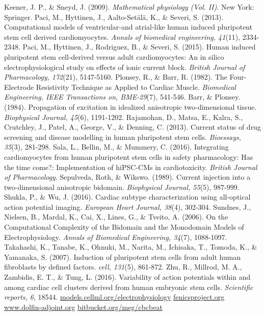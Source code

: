 \documentclass[12pt,a4paper]{article}
\begin{document}
\begin{thebibliography}{99}
 Keener, J. P., \& Sneyd, J. (2009). \textit{Mathematical physiology (Vol. II)}. New York: Springer.
 Paci, M., Hyttinen, J., Aalto-Set\"al\"a, K., \& Severi, S. (2013). Computational models of ventricular-and atrial-like human induced pluripotent stem cell derived cardiomyocytes. \textit{Annals of biomedical engineering, 41}(11), 2334-2348.
 Paci, M., Hyttinen, J., Rodriguez, B., \& Severi, S. (2015). Human induced pluripotent stem cell‐derived versus adult cardiomyocytes: An in silico electrophysiological study on effects of ionic current block. \textit{British Journal of Pharmacology, 172}(21), 5147-5160.
 Plonsey, R., \& Barr, R. (1982). The Four-Electrode Resistivity Technique as Applied to Cardiac Muscle. \textit{Biomedical Engineering, IEEE Transactions on, BME-29}(7), 541-546.
 Barr, \& Plonsey. (1984). Propagation of excitation in idealized anisotropic two-dimensional tissue. \textit{Biophysical Journal, 45}(6), 1191-1202.
 Rajamohan, D., Matsa, E., Kalra, S., Crutchley, J., Patel, A., George, V., \& Denning, C. (2013). Current status of drug screening and disease modelling in human pluripotent stem cells. \textit{Bioessays, 35}(3), 281-298.
 Sala, L., Bellin, M., \& Mummery, C. (2016). Integrating cardiomyocytes from human pluripotent stem cells in safety pharmacology: Has the time come?: Implementation of hiPSC-CMs in cardiotoxicity. \textit{British Journal of Pharmacology}.
 Sepulveda, Roth, \& Wikswo. (1989). Current injection into a two-dimensional anisotropic bidomain. \textit{Biophysical Journal, 55}(5), 987-999.
 Shukla, P., \& Wu, J. (2016). Cardiac subtype characterization using all-optical action potential imaging. \textit{European Heart Journal, 38}(4), 302-304.
 Sundnes, J., Nielsen, B., Mardal, K., Cai, X., Lines, G., \& Tveito, A. (2006). On the Computational Complexity of the Bidomain and the Monodomain Models of Electrophysiology. \textit{Annals of Biomedical Engineering, 34}(7), 1088-1097.
 Takahashi, K., Tanabe, K., Ohnuki, M., Narita, M., Ichisaka, T., Tomoda, K., \& Yamanaka, S. (2007). Induction of pluripotent stem cells from adult human fibroblasts by defined factors. \textit{cell, 131}(5), 861-872.
 Zhu, R., Millrod, M. A., Zambidis, E. T., \& Tung, L. (2016). Variability of action potentials within and among cardiac cell clusters derived from human embryonic stem cells. \textit{Scientific reports, 6}, 18544.
 \url{models.cellml.org/electrophysiology}
 \url{fenicsproject.org}
 \url{www.dolfin-adjoint.org}
 \url{bitbucket.org/meg/cbcbeat}
\end{thebibliography}
%
\end{document}
